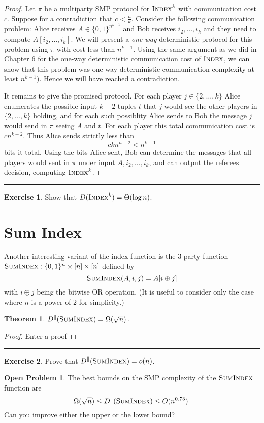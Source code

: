 \documentclass[11pt]{amsart}
\theoremstyle{plain}
\newtheorem{theorem}{Theorem}
\theoremstyle{definition}
\newtheorem{exercise}{Exercise}
\newtheorem{open}{Open Problem}
\theoremstyle{plain}
\newcommand{\Index}{\textsc{Index}}
\newcommand{\SumIndex}{\textsc{SumIndex}}
\newcommand{\exercises}{\bigskip \noindent\rule{8cm}{0.4pt} \medskip}
\begin{document}
\begin{proof}
Let $\pi$ be a multiparty SMP protocol for $\Index^k$ with communication cost $c$. Suppose for a contradiction that $c < \frac{n}{k}$. Consider the following communication problem: Alice receives $A \in \{0,1\}^{n^{k-1}}$ and Bob receives $i_2,\dots, i_k$ and they need to compute $A[i_2,\dots, i_k]$. We will present a \emph{one-way} deterministic protocol for this problem using $\pi$ with cost less than $n^{k-1}$. Using the same argument as we did in Chapter $6$ for the one-way deterministic communication cost of $\Index$, we can show that this problem was one-way deterministic communication complexity at least $n^{{k-1}})$. Hence we will have reached a contradiction.

It remains to give the promised protocol. For each player $j \in \{2, \dots, k\}$ Alice enumerates the possible input $k-2$-tuples $t$ that $j$ would see the other players in $\{2,\dots, k\}$ holding, and for each such possiblity Alice sends to Bob the message $j$ would send in $\pi$ seeing $A$ and $t$. For each player this total communication cost is $cn^{k-2}$. Thus Alice sends strictly less than
$$ckn^{n-2} < n^{k-1}$$
bits it total.
Using the bits Alice sent, Bob can determine the messages that all players would sent in $\pi$ under input $A,i_2,\dots, i_k$, and can output the referees decision, computing $\Index^k$.
\end{proof}

\exercises

\begin{exercise}
Show that $D(\Index^k) = \Theta(\log n)$.
\end{exercise}


\newpage 
\section{Sum Index}

Another interesting variant of the index function is the 3-party function $\SumIndex : \{0,1\}^n \times [n] \times [n]$ defined by
\[
\SumIndex(A,i,j) = A[ i \oplus j]
\]
with $i \oplus j$ being the bitwise OR operation. (It is useful to consider only the case where $n$ is a power of $2$ for simplicity.)

\begin{theorem}
$D^\parallel(\SumIndex) = \Omega(\sqrt{n})$.
\end{theorem}

\begin{proof}
Enter a proof

\end{proof}

\exercises

\begin{exercise}
Prove that $D^\parallel(\SumIndex) = o(n)$.
\end{exercise}

\begin{open}
The best bounds on the SMP complexity of the $\SumIndex$ function are
\[
\Omega(\sqrt{n}) \le D^\parallel(\SumIndex) \le O(n^{0.73}).
\]
Can you improve either the upper or the lower bound?
\end{open}
\end{document}
